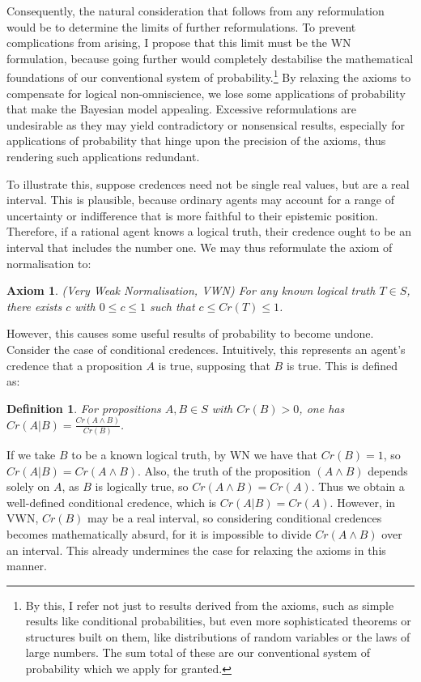 \documentclass[12pt]{article}
\newtheorem{definition}{Definition}
\newtheorem{axiom}{Axiom}
\begin{document}
Consequently, the natural consideration that follows from any reformulation would be to determine the limits of further reformulations. To prevent complications from arising, I propose that this limit must be the WN formulation, because going further would completely destabilise the mathematical foundations of our conventional system of probability.\footnote{By this, I refer not just to results derived from the axioms, such as simple results like conditional probabilities, but even more sophisticated theorems or structures built on them, like distributions of random variables or the laws of large numbers. The sum total of these are our conventional system of probability which we apply for granted.}  By relaxing the axioms to compensate for logical non-omniscience, we lose some applications of probability that make the Bayesian model appealing.\autocite[436]{oup} Excessive reformulations are undesirable as they may yield contradictory or nonsensical results, especially for applications of probability that hinge upon the precision of the axioms, thus rendering such applications redundant.

To illustrate this, suppose credences need not be single real values, but are a real interval. This is plausible, because ordinary agents may account for a range of uncertainty or indifference that is more faithful to their epistemic position. Therefore, if a rational agent knows a logical truth, their credence ought to be an interval that includes the number one.\autocite{sep} We may thus reformulate the axiom of normalisation to:
\begin{axiom}
    (Very Weak Normalisation, VWN) For any known logical truth $T\in S$, there exists $c$ with $0\leq c\leq 1$ such that $c\leq Cr(T)\leq1$.
\end{axiom}
However, this causes some useful results of probability to become undone. Consider the case of conditional credences. Intuitively, this represents an agent's credence that a proposition $A$ is true, supposing that $B$ is true.\autocite[32]{bdrc} This is defined as:
\begin{definition}
    For propositions $A,B\in S$ with $Cr(B)>0$, one has $Cr(A|B)=\frac{Cr(A\land B)}{Cr(B)}$.
\end{definition}
If we take $B$ to be a known logical truth, by WN we have that $Cr(B)=1$, so $Cr(A|B)=Cr(A\land B)$. Also, the truth of the proposition $(A\land B)$ depends solely on $A$, as $B$ is logically true, so $Cr(A\land B)=Cr(A)$. Thus we obtain a well-defined conditional credence, which is $Cr(A|B)=Cr(A)$. However, in VWN, $Cr(B)$ may be a real interval, so considering conditional credences becomes mathematically absurd, for it is impossible to divide $Cr(A\land B)$ over an interval. This already undermines the case for relaxing the axioms in this manner.
\end{document}
